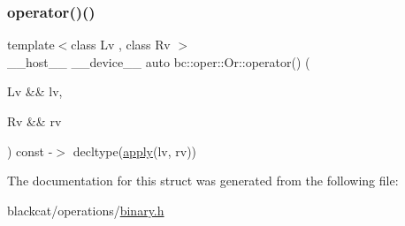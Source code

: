 \mbox{\label{structbc_1_1oper_1_1Or_a135387badff87724b2e866c193b98d60}} 
\subsubsection{\texorpdfstring{operator()()}{operator()()}}
{\footnotesize\ttfamily template$<$class Lv , class Rv $>$ \\
\+\_\+\+\_\+host\+\_\+\+\_\+ \+\_\+\+\_\+device\+\_\+\+\_\+ auto bc\+::oper\+::\+Or\+::operator() (\begin{DoxyParamCaption}\item[{Lv \&\&}]{lv,  }\item[{Rv \&\&}]{rv }\end{DoxyParamCaption}) const -\/$>$ decltype(\hyperlink{structbc_1_1oper_1_1Or_a1453c9a745d14b50790518c691646e3b}{apply}(lv, rv)) \hspace{0.3cm}{\ttfamily [inline]}}



The documentation for this struct was generated from the following file\+:\begin{DoxyCompactItemize}
\item 
blackcat/operations/\hyperlink{binary_8h}{binary.\+h}\end{DoxyCompactItemize}
